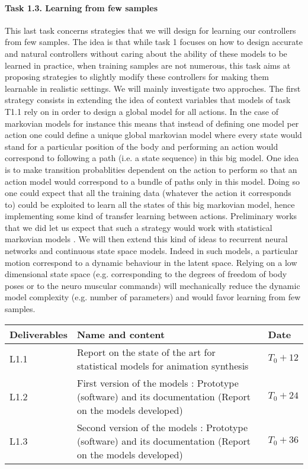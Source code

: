 \paragraph{Task 1.3. Learning from few samples}
This last task concerns strategies that we will design for learning our controllers from few samples. The idea is that while task 1 focuses on how to design accurate and natural controllers without caring about the ability of these models to be learned in practice, when training samples are not numerous, this task aims at proposing strategies to slightly modify these controllers for making them learnable in realistic settings.
We will mainly investigate two approches. The first strategy consists in extending the idea of context variables that models of task T1.1 rely on in order to design a global model for all actions. In the case of markovian models for instance this means that instead of defining one model per action one could define a unique global markovian model where every state would stand for a particular position of the body and performing an action would correspond to following a path (i.e. a state sequence) in this big model. 
One idea is to make transition probablities dependent on the action to perform so that an action model would correspond to a bundle of paths only in this model.  Doing so one could expect that all the training data (whatever the action it corresponds to) could be exploited to learn all the states of this big markovian model, hence implementing some kind of transfer learning between actions.  Preliminary works that we did let us expect that such a strategy would work with statistical markovian models \cite{DBLP:conf/icassp/DingRAP13, Radenen2014}. We will then extend this kind of ideas to recurrent neural networks and continuous state space models. Indeed in such models, a particular motion correspond to a dynamic behaviour in the latent space. Relying on a low dimensional state space (e.g. corresponding to the degrees of freedom of body poses or to the neuro muscular commands) will mechanically reduce the dynamic model complexity (e.g. number of parameters) and would favor learning from few samples.

\vspace{1cm}

\begin{tabular}{|p{2cm}|p{10cm}|p{1.5cm}|}\hline
Deliverables & Name and content  & Date  \\\hline
L1.1  & Report on the state of the art for statistical models for animation synthesis &  $T_0+12$ \\\hline
L1.2  & First version of the models : Prototype (software) and its documentation (Report on the models developed) & $T_0+24$ \\\hline
L1.3  & Second version of the models : Prototype (software) and its documentation (Report on the models developed)  & $T_0+36$ \\\hline
\end{tabular}

